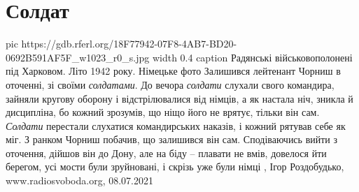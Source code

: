  
 
 
 
 
\chapter{Солдат}

\ifcmt
  pic https://gdb.rferl.org/18F77942-07F8-4AB7-BD20-0692B591AF5F_w1023_r0_s.jpg
	width 0.4
	caption Радянські військовополонені під Харковом. Літо 1942 року. Німецьке фото
\fi
Залишився лейтенант Чорниш в оточенні, зі своїми \emph{солдатами}. До вечора \emph{солдати}
слухали свого командира, зайняли кругову оборону і відстрілювалися від німців,
а як настала ніч, зникла й дисципліна, бо кожний зрозумів, що ніщо його не
врятує, тільки він сам. \emph{Солдати} перестали слухатися командирських наказів, і
кожний рятував себе як міг. З ранком Чорниш побачив, що залишився він сам.
Сподіваючись вийти з оточення, дійшов він до Дону, але на біду – плавати не
вмів, довелося йти берегом, усі мости були зруйновані, і скрізь уже були німці
, 
Ігор Роздобудько, www.radiosvoboda.org, 08.07.2021

